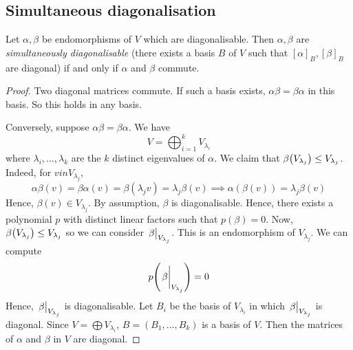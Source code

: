 \subsection{Simultaneous diagonalisation}
\begin{theorem}
	Let \( \alpha, \beta \) be endomorphisms of \( V \) which are diagonalisable.
	Then \( \alpha, \beta \) are \textit{simultaneously diagonalisable} (there exists a basis \( B \) of \( V \) such that \( [\alpha]_B, [\beta]_B \) are diagonal) if and only if \( \alpha \) and \( \beta \) commute.
\end{theorem}
\begin{proof}
	Two diagonal matrices commute.
	If such a basis exists, \( \alpha \beta = \beta \alpha \) in this basis.
	So this holds in any basis.

	Conversely, suppose \( \alpha \beta = \beta \alpha \).
	We have
	\[
		V = \bigoplus_{i=1}^k V_{\lambda_i}
	\]
	where \( \lambda_i, \dots, \lambda_k \) are the \( k \) distinct eigenvalues of \( \alpha \).
	We claim that \( \beta \qty(V_{\lambda_j}) \leq V_{\lambda_j} \).
	Indeed, for \( v in V_{\lambda_j} \),
	\[
		\alpha \beta(v) = \beta \alpha(v) = \beta(\lambda_j v) = \lambda_j \beta(v) \implies \alpha(\beta(v)) = \lambda_j \beta(v)
	\]
	Hence, \( \beta(v) \in V_{\lambda_j} \).
	By assumption, \( \beta \) is diagonalisable.
	Hence, there exists a polynomial \( p \) with distinct linear factors such that \( p(\beta) = 0 \).
	Now, \( \beta\qty(V_{\lambda_j}) \leq V_{\lambda_j} \) so we can consider \( \eval{\beta}_{V_{\lambda_j}} \).
	This is an endomorphism of \( V_{\lambda_j} \).
	We can compute
	\[
		p\qty(\eval{\beta}_{V_{\lambda_j}}) = 0
	\]
	Hence, \( \eval{\beta}_{V_{\lambda_j}} \) is diagonalisable.
	Let \( B_i \) be the basis of \( V_{\lambda_i} \) in which \( \eval{\beta}_{V_{\lambda_j}} \) is diagonal.
	Since \( V = \bigoplus V_{\lambda_i} \), \( B = (B_1, \dots, B_k) \) is a basis of \( V \).
	Then the matrices of \( \alpha \) and \( \beta \) in \( V \) are diagonal.
\end{proof}

